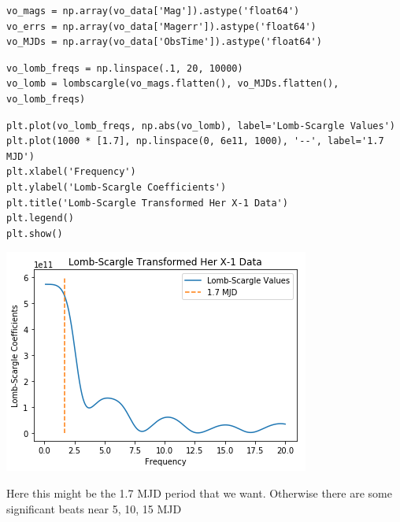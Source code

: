 \documentclass[11pt]{article}
\begin{document}
\begin{verbatim}
vo_mags = np.array(vo_data['Mag']).astype('float64')
vo_errs = np.array(vo_data['Magerr']).astype('float64')
vo_MJDs = np.array(vo_data['ObsTime']).astype('float64')
\end{verbatim}



\begin{verbatim}
vo_lomb_freqs = np.linspace(.1, 20, 10000)
vo_lomb = lombscargle(vo_mags.flatten(), vo_MJDs.flatten(), vo_lomb_freqs)
\end{verbatim}


\begin{verbatim}
plt.plot(vo_lomb_freqs, np.abs(vo_lomb), label='Lomb-Scargle Values')
plt.plot(1000 * [1.7], np.linspace(0, 6e11, 1000), '--', label='1.7 MJD')
plt.xlabel('Frequency')
plt.ylabel('Lomb-Scargle Coefficients')
plt.title('Lomb-Scargle Transformed Her X-1 Data')
plt.legend()
plt.show()
\end{verbatim}

\includegraphics[width=.9\linewidth]{./obipy-resources/1708788X.png}

Here this might be the 1.7 MJD period that we want. Otherwise there are some
significant beats near 5, 10, 15 MJD
\end{document}
